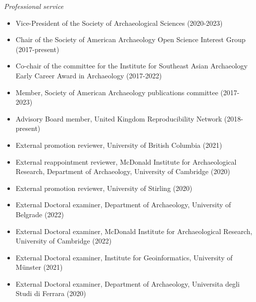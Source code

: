 \medskip

\noindent\emph{Professional service\vspace{0.01in}}

\medskip

\begin{itemize}[noitemsep, font=$\bullet$\scshape\bfseries]

\item Vice-President of the Society of Archaeological Sciences (2020-2023)

\item Chair of the Society of American Archaeology Open Science Interest Group (2017-present)

\item Co-chair of the committee for the Institute for Southeast Asian Archaeology Early Career Award in Archaeology (2017-2022)

\item Member, Society of American Archaeology publications committee (2017-2023)

\item Advisory Board member, United Kingdom Reproducibility Network (2018-present)

\item External promotion reviewer, University of British Columbia (2021)

\item External reappointment reviewer, McDonald Institute for Archaeological Research, Department of Archaeology, University of Cambridge (2020)

\item External promotion reviewer, University of Stirling (2020)

\item External Doctoral examiner, Department of Archaeology, University of Belgrade (2022)

\item External Doctoral examiner, McDonald Institute for Archaeological Research, University of Cambridge (2022)

\item External Doctoral examiner, Institute for Geoinformatics, University of Münster (2021)

\item External Doctoral examiner, Department of Archaeology, Universita degli Studi di Ferrara (2020)

\end{itemize}

